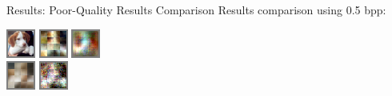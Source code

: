 \documentclass[10pt]{beamer}
\begin{document}
  \begin{frame}{Results: Poor-Quality Results Comparison}
    Results comparison using 0.5 bpp:
    \begin{center}
      \includegraphics[width=0.3\linewidth]{./img/decoded_imgs/dog.png}
      \includegraphics[width=0.3\linewidth]{./img/decoded_imgs/dog_FC_64B.png}
      \includegraphics[width=0.3\linewidth]{./img/decoded_imgs/dog_ConvRes_p32_b64-p8.png}\\
      \includegraphics[width=0.3\linewidth]{./img/decoded_imgs/dog_LSTM.png}
      \includegraphics[width=0.3\linewidth]{./img/decoded_imgs/dog_64B.png}

\end{center}
\end{frame}
\end{document}
